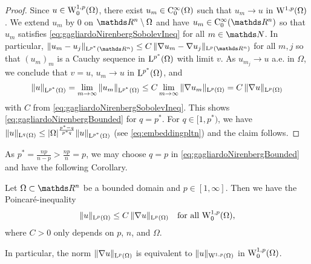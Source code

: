 \begin{proof}
  Since $u \in \mathrm{W}_0^{1,p}(\Omega)$, there exist $u_m \in \mathrm{C}_0^\infty(\Omega)$ such that $u_m \to u$ in $\mathrm{W}^{1,p}(\Omega)$.
  We extend $u_m$ by $0$ on $\R^n\setminus \Omega$ and have $u_m \in \CC_0^\infty(\R^n)$ so that $u_m$ satisfies \eqref{eq:gagliardoNirenbergSobolevIneq} for all $m \in \N$.
  In particular, $\|u_m - u_j\|_{\Ell^{p^*}(\R^n)} \leq C \, \| \nabla u_m - \nabla u_j\|_{\Ell^p(\R^n)}$ for all $m,j$ so that $(u_m)_m$ is a Cauchy sequence in $\mathrm{L}^{p^*}(\Omega)$ with limit $v$.
  As $u_{m_j} \to u$ a.e. in $\Omega$, we conclude that $v = u$, $u_m \to u$ in $\mathrm{L}^{p^*}(\Omega)$, and 
  $$
  \|u\|_{\mathrm{L}^{p^*}(\Omega)}
  = \lim_{m \to \infty} \| u_m \|_{\mathrm{L}^{p^*}(\Omega)}
  \leq C  \lim_{m \to \infty} \| \nabla u_m\|_{\mathrm{L}^p(\Omega)}
  = C \, \| \nabla u\|_{\mathrm{L}^p(\Omega)}
  $$
  with $C$ from \eqref{eq:gagliardoNirenbergSobolevIneq}.
  This shows \eqref{eq:gagliardoNirenbergBounded} for $q = p^*$.
  For $q \in [1,p^*)$, we have $\|u\|_{\mathrm{L}^q(\Omega)} \leq |\Omega|^{\frac{p^* - q}{p^* q}} \|u\|_{\mathrm{L}^{p^*}(\Omega)}$ (see \eqref{eq:embeddingpltn}) and the claim follows.
\end{proof}

As $p^* = \frac{np}{n - p} > \frac{np}{n} = p$, we may choose $q = p$ in \eqref{eq:gagliardoNirenbergBounded} and have  the following Corollary.

\begin{cor}
  \label{cor:poincare}
  Let $\Omega \subset \R^n$ be a bounded domain and $p \in [1,\infty]$. 
  Then we have the Poincar\'e-inequality
  \begin{equation}
    \label{eq:poincare}
    \|u\|_{\mathrm{L}^p(\Omega)} \leq C \, \|\nabla u\|_{\mathrm{L}^p(\Omega)} \quad\text{for all } \mathrm{W}_0^{1,p}(\Omega),
  \end{equation}
  where $C > 0$ only depends on $p$, $n$, and $\Omega$.

  In particular, the norm $\|\nabla u\|_{\mathrm{L}^p(\Omega)}$ is equivalent to $\|u\|_{\mathrm{W}^{1,p}(\Omega)}$ in $\mathrm{W}_0^{1,p}(\Omega)$.
\end{cor}

